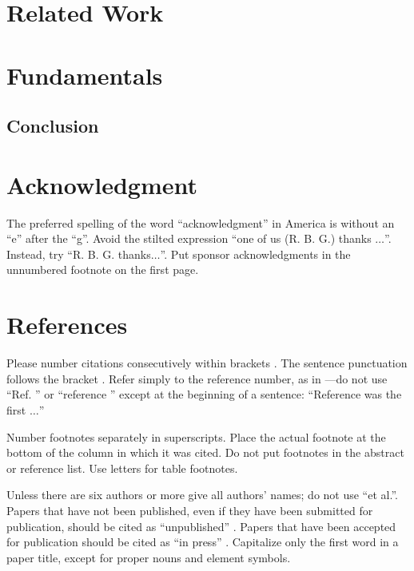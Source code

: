\documentclass[conference]{IEEEtran}
\begin{document}
\section{Related Work}



\section{Fundamentals}


\subsection{Conclusion}




\section*{Acknowledgment}

The preferred spelling of the word ``acknowledgment'' in America is without 
an ``e'' after the ``g''. Avoid the stilted expression ``one of us (R. B. 
G.) thanks $\ldots$''. Instead, try ``R. B. G. thanks$\ldots$''. Put sponsor 
acknowledgments in the unnumbered footnote on the first page.

\section*{References}

Please number citations consecutively within brackets \cite{b1}. The 
sentence punctuation follows the bracket \cite{b2}. Refer simply to the reference 
number, as in \cite{b3}---do not use ``Ref. \cite{b3}'' or ``reference \cite{b3}'' except at 
the beginning of a sentence: ``Reference \cite{b3} was the first $\ldots$''

Number footnotes separately in superscripts. Place the actual footnote at 
the bottom of the column in which it was cited. Do not put footnotes in the 
abstract or reference list. Use letters for table footnotes.

Unless there are six authors or more give all authors' names; do not use 
``et al.''. Papers that have not been published, even if they have been 
submitted for publication, should be cited as ``unpublished'' \cite{b4}. Papers 
that have been accepted for publication should be cited as ``in press'' \cite{b5}. 
Capitalize only the first word in a paper title, except for proper nouns and 
element symbols.
\end{document}
